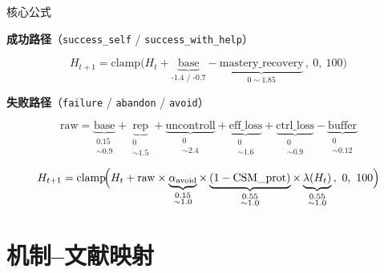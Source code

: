 \documentclass[aspectratio=169]{beamer}
\begin{document}
\begin{frame}{核心公式}

\textbf{成功路径}（\texttt{success\_self} / \texttt{success\_with\_help}）

\vspace{0.15cm}
\[
H_{t+1} = \text{clamp}\!\bigl(H_t + \underbrace{\text{base}}_{\text{-1.4 / -0.7}} - \underbrace{\text{mastery\_recovery}}_{0 \sim 1.85}\,,\ 0,\ 100\bigr)
\]

\vspace{0.3cm}
\textbf{失败路径}（\texttt{failure} / \texttt{abandon} / \texttt{avoid}）

\vspace{0.15cm}
\[
\text{raw} = \underbrace{\text{base}}_{\substack{0.15 \\ \sim 0.9}}
+ \underbrace{\text{rep}}_{\substack{0 \\ \sim 1.5}}
+ \underbrace{\text{uncontroll}}_{\substack{0 \\ \sim 2.4}}
+ \underbrace{\text{eff\_loss}}_{\substack{0 \\ \sim 1.6}}
+ \underbrace{\text{ctrl\_loss}}_{\substack{0 \\ \sim 0.9}}
- \underbrace{\text{buffer}}_{\substack{0 \\ \sim 0.12}}
\]

\vspace{0.1cm}
\[
H_{t+1} = \text{clamp}\!\Bigl(H_t
+ \text{raw}
\times \underbrace{\alpha_{\text{avoid}}}_{\substack{0.15 \\ \sim 1.0}}
\times \underbrace{(1 - \text{CSM\_prot})}_{\substack{0.55 \\ \sim 1.0}}
\times \underbrace{\lambda(H_t)}_{\substack{0.55 \\ \sim 1.0}}
\,,\ 0,\ 100\Bigr)
\]

\end{frame}

\section{机制--文献映射}
\end{document}
